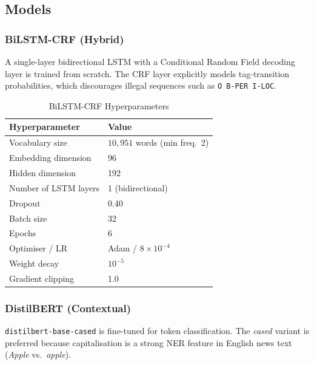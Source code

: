 \subsection{Models}

\subsubsection{BiLSTM-CRF (Hybrid)}

A single-layer bidirectional LSTM with a Conditional Random Field
decoding layer \cite{lample2016neural} is trained from scratch. The
CRF layer explicitly models tag-transition probabilities, which
discourages illegal sequences such as \texttt{O B-PER I-LOC}.

\begin{table}[h]
\centering
\caption{BiLSTM-CRF Hyperparameters}
\label{tab:bilstm_crf_hp}
\begin{tabular}{ll}
\toprule
Hyperparameter & Value \\
\midrule
Vocabulary size           & $10{,}951$ words (min freq.\ 2) \\
Embedding dimension       & 96 \\
Hidden dimension          & 192 \\
Number of LSTM layers     & 1 (bidirectional) \\
Dropout                   & 0.40 \\
Batch size                & 32 \\
Epochs                    & 6 \\
Optimiser / LR            & Adam / $8 \times 10^{-4}$ \\
Weight decay              & $10^{-5}$ \\
Gradient clipping         & 1.0 \\
\bottomrule
\end{tabular}
\end{table}

\subsubsection{DistilBERT (Contextual)}

\texttt{distilbert-base-cased} is fine-tuned for token classification.
The \emph{cased} variant is preferred because capitalisation is a strong
NER feature in English news text (\textit{Apple} vs.\ \textit{apple}).

